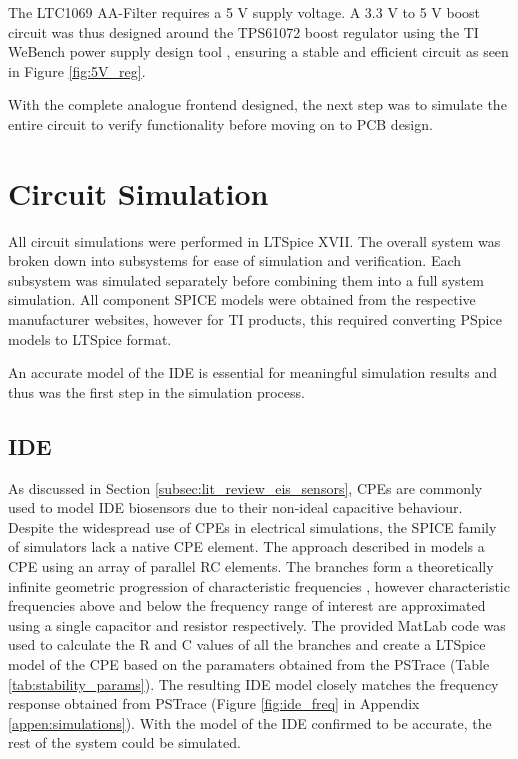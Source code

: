 The LTC1069 AA-Filter requires a 5 V supply voltage. A 3.3 V to 5 V boost circuit was thus designed around the TPS61072 boost regulator using the TI WeBench power supply design tool \cite{WEBENCHCIRCUITDESIGNERDesignTool}, ensuring a stable and efficient circuit as seen in Figure \ref{fig:5V_reg}. 

With the complete analogue frontend designed, the next step was to simulate the entire circuit to verify functionality before moving on to PCB design.

\section{Circuit Simulation}
All circuit simulations were performed in LTSpice XVII. The overall system was broken down into subsystems for ease of simulation and verification. Each subsystem was simulated separately before combining them into a full system simulation. All component SPICE models were obtained from the respective manufacturer websites, however for TI products, this required converting PSpice models to LTSpice format.

An accurate model of the \ac{IDE} is essential for meaningful simulation results and thus was the first step in the simulation process.
\subsection{IDE}
As discussed in Section \ref{subsec:lit_review_eis_sensors}, \acp{CPE} are commonly used to model \ac{IDE} biosensors due to their non-ideal capacitive behaviour. Despite the widespread use of \acp{CPE} in electrical simulations, the SPICE family of simulators lack a native CPE element. The approach described in \cite{wilsonSimulatingFractionalCapacitors2023} models a CPE using an array of parallel RC elements. The branches form a theoretically infinite geometric progression of characteristic frequencies \cite{wilsonSimulatingFractionalCapacitors2023}, however characteristic frequencies above and below the frequency range of interest are approximated using a single capacitor and resistor respectively. The provided MatLab code was used to calculate the R and C values of all the branches and create a LTSpice model of the CPE based on the paramaters obtained from the PSTrace (Table \ref{tab:stability_params}). The resulting IDE model closely matches the frequency response obtained from PSTrace (Figure \ref{fig:ide_freq} in Appendix \ref{appen:simulations}). With the model of the \ac{IDE} confirmed to be accurate, the rest of the system could be simulated.

